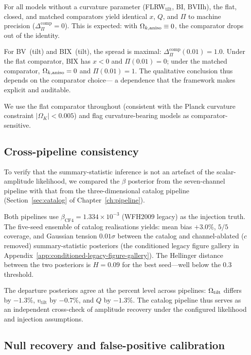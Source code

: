 For all models without a curvature parameter (FLRW$_{\mathrm{tilt}}$,
BI, BVIIh), the flat, closed, and matched comparators yield
identical $x$, $Q$, and $\Pi$ to machine precision
($\Delta_\Pi^{\mathrm{comp}} = 0$).  This is expected: with
$\Omega_{k,\mathrm{aniso}} \equiv 0$, the comparator drops out of the identity.

For BV~(tilt) and BIX~(tilt), the spread is maximal:
$\Delta_\Pi^{\mathrm{comp}}(0.01) = 1.0$.  Under the flat
comparator, BIX has $x < 0$ and $\Pi(0.01) = 0$; under the
matched comparator, $\Omega_{k,\mathrm{aniso}} = 0$ and $\Pi(0.01) = 1$.  The
qualitative conclusion thus depends on the comparator choice---
a dependence that the framework makes explicit and auditable.

We use the flat comparator throughout (consistent with the
Planck curvature constraint $|\Omega_K| < 0.005$) and flag
curvature-bearing models as comparator-sensitive.


\subsection{Cross-pipeline consistency}
\label{sec:cross-pipeline}

To verify that the summary-statistic inference is not an
artefact of the scalar-amplitude likelihood, we compared the
$\beta$ posterior from the seven-channel pipeline with that
from the three-dimensional catalog pipeline
(Section~\ref{sec:catalog} of Chapter~\ref{ch:pipeline}).

Both pipelines use $\beta_{\mathrm{CF4}} = 1.334 \times 10^{-3}$
(WFH2009 legacy) as the injection truth.  The five-seed ensemble of catalog
realisations yields: mean bias $+3.0\%$, $5/5$ coverage, and
Gaussian tension $0.01\sigma$ between the catalog and channel-ablated
($c$ removed) summary-statistic posteriors
(the conditioned legacy figure gallery in Appendix~\ref{app:conditioned-legacy-figure-gallery}).  The Hellinger distance
between the two posteriors is $H = 0.09$ for the best seed---well
below the 0.3 threshold.

The departure posteriors agree at the percent level across
pipelines: $\Omega_{\mathrm{tilt}}$ differs by $-1.3\%$,
$v_{\mathrm{tilt}}$ by $-0.7\%$, and $Q$ by $-1.3\%$.  The
catalog pipeline thus serves as an independent cross-check of
amplitude recovery under the configured likelihood and injection
assumptions.


\subsection{Null recovery and false-positive calibration}
\label{sec:null-pipeline}

